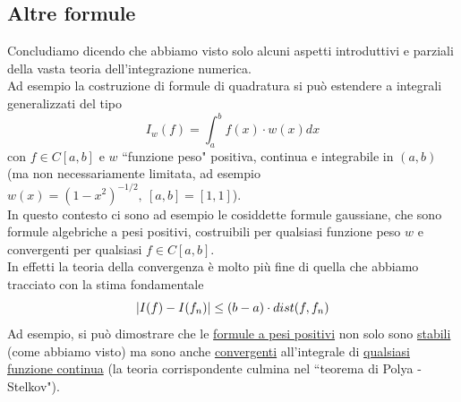 \documentclass[12pt,a4paper]{article}
\DeclarePairedDelimiter{\abs}{\lvert}{\rvert}
\begin{document}
\subsection{Altre formule}
Concludiamo dicendo che abbiamo visto solo alcuni aspetti introduttivi e parziali della vasta teoria dell'integrazione numerica.\\
Ad esempio la costruzione di formule di quadratura si può estendere a integrali generalizzati del tipo
\[
I_w (f) = \int_a^b f(x) \cdot w(x) dx
\]
con $f \in C[a,b]$ e $w$ ``funzione peso" positiva, continua e integrabile in $(a,b)$ (ma non necessariamente limitata, ad esempio $w(x) = (1-x^2)^{-1/2}, \ [a,b] = [1,1]$).\\
In questo contesto ci sono ad esempio le cosiddette formule gaussiane, che sono formule algebriche a pesi positivi, costruibili per qualsiasi funzione peso $w$ e convergenti per qualsiasi $f \in C [a,b]$.\\
In effetti la teoria della convergenza è molto più fine di quella che abbiamo tracciato con la stima fondamentale
\[
\abs{I(f) - I(f_n)} \le (b-a) \cdot dist(f, f_n)
\]
Ad esempio, si può dimostrare che le \uline{formule a pesi positivi} non solo sono \uline{stabili} (come
abbiamo visto) ma sono anche \uline{convergenti} all'integrale di \uline{qualsiasi funzione continua} (la teoria corrispondente culmina nel ``teorema di Polya - Stelkov").
\end{document}
